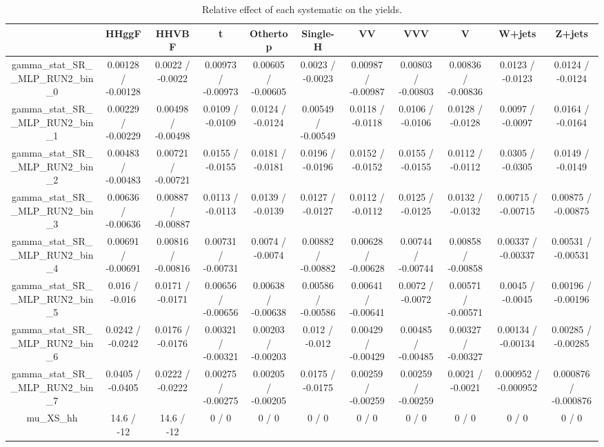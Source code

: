 \documentclass[10pt]{article}
\begin{document}
\begin{table}[htbp]
\begin{center}
\begin{tabular}{|c|c|c|c|c|c|c|c|c|c|c|}
\hline 
      & HHggF      & HHVBF      & t      & Othertop      & Single-H      & VV      & VVV      & V      & W+jets      & Z+jets \\ 
\hline 
  gamma_stat_SR__MLP_RUN2_bin_0 & 0.00128 / -0.00128 & 0.0022 / -0.0022 & 0.00973 / -0.00973 & 0.00605 / -0.00605 & 0.0023 / -0.0023 & 0.00987 / -0.00987 & 0.00803 / -0.00803 & 0.00836 / -0.00836 & 0.0123 / -0.0123 & 0.0124 / -0.0124 \\ 
  gamma_stat_SR__MLP_RUN2_bin_1 & 0.00229 / -0.00229 & 0.00498 / -0.00498 & 0.0109 / -0.0109 & 0.0124 / -0.0124 & 0.00549 / -0.00549 & 0.0118 / -0.0118 & 0.0106 / -0.0106 & 0.0128 / -0.0128 & 0.0097 / -0.0097 & 0.0164 / -0.0164 \\ 
  gamma_stat_SR__MLP_RUN2_bin_2 & 0.00483 / -0.00483 & 0.00721 / -0.00721 & 0.0155 / -0.0155 & 0.0181 / -0.0181 & 0.0196 / -0.0196 & 0.0152 / -0.0152 & 0.0155 / -0.0155 & 0.0112 / -0.0112 & 0.0305 / -0.0305 & 0.0149 / -0.0149 \\ 
  gamma_stat_SR__MLP_RUN2_bin_3 & 0.00636 / -0.00636 & 0.00887 / -0.00887 & 0.0113 / -0.0113 & 0.0139 / -0.0139 & 0.0127 / -0.0127 & 0.0112 / -0.0112 & 0.0125 / -0.0125 & 0.0132 / -0.0132 & 0.00715 / -0.00715 & 0.00875 / -0.00875 \\ 
  gamma_stat_SR__MLP_RUN2_bin_4 & 0.00691 / -0.00691 & 0.00816 / -0.00816 & 0.00731 / -0.00731 & 0.0074 / -0.0074 & 0.00882 / -0.00882 & 0.00628 / -0.00628 & 0.00744 / -0.00744 & 0.00858 / -0.00858 & 0.00337 / -0.00337 & 0.00531 / -0.00531 \\ 
  gamma_stat_SR__MLP_RUN2_bin_5 & 0.016 / -0.016 & 0.0171 / -0.0171 & 0.00656 / -0.00656 & 0.00638 / -0.00638 & 0.00586 / -0.00586 & 0.00641 / -0.00641 & 0.0072 / -0.0072 & 0.00571 / -0.00571 & 0.0045 / -0.0045 & 0.00196 / -0.00196 \\ 
  gamma_stat_SR__MLP_RUN2_bin_6 & 0.0242 / -0.0242 & 0.0176 / -0.0176 & 0.00321 / -0.00321 & 0.00203 / -0.00203 & 0.012 / -0.012 & 0.00429 / -0.00429 & 0.00485 / -0.00485 & 0.00327 / -0.00327 & 0.00134 / -0.00134 & 0.00285 / -0.00285 \\ 
  gamma_stat_SR__MLP_RUN2_bin_7 & 0.0405 / -0.0405 & 0.0222 / -0.0222 & 0.00275 / -0.00275 & 0.00205 / -0.00205 & 0.0175 / -0.0175 & 0.00259 / -0.00259 & 0.00259 / -0.00259 & 0.0021 / -0.0021 & 0.000952 / -0.000952 & 0.000876 / -0.000876 \\ 
  mu_XS_hh & 14.6 / -12 & 14.6 / -12 & 0 / 0 & 0 / 0 & 0 / 0 & 0 / 0 & 0 / 0 & 0 / 0 & 0 / 0 & 0 / 0 \\ 
\hline 
\end{tabular} 
\caption{Relative effect of each systematic on the yields.} 
\end{center} 
\end{table} 
\end{document}
